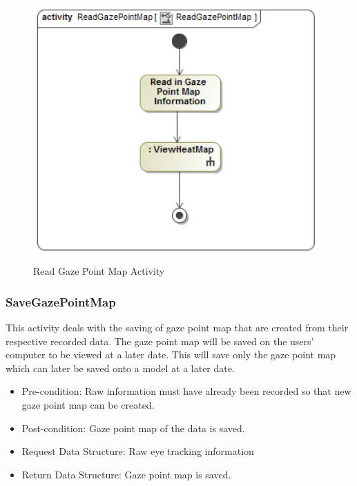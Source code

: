 	\begin{figure}[!ht]
		\centering
		\includegraphics[scale=0.5,width=15cm,keepaspectratio]{Diagrams/Activity_Diagram__ReadGazePointMap__ReadGazePointMap.png}
		\caption{Read Gaze Point Map Activity}
	\end{figure}
	
	\subsubsection{SaveGazePointMap}
	This activity deals with the saving of gaze point map that are created from their respective recorded data. The gaze point map will be saved on the users' computer to be viewed at a later date. This will save only the gaze point map which can later be saved onto a model at a later date.
	\begin{itemize}
		\item Pre-condition: Raw information must have already been recorded so that new gaze point map can be created.
		\item Post-condition: Gaze point map of the data is saved.
		\item Request Data Structure: Raw eye tracking information
		\item Return Data Structure: Gaze point map is saved.
	\end{itemize}
	
